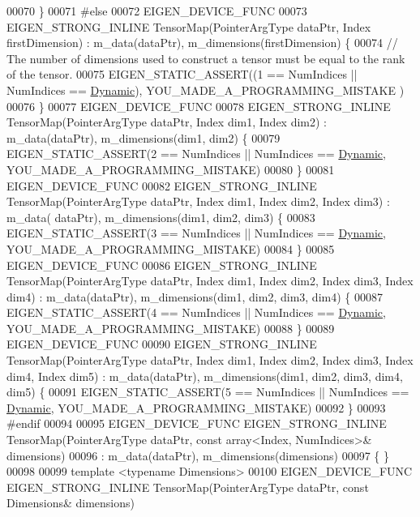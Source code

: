 \begin{DoxyCode}
00070     \}
00071 \textcolor{preprocessor}{#else}
00072     EIGEN\_DEVICE\_FUNC
00073     EIGEN\_STRONG\_INLINE TensorMap(PointerArgType dataPtr, Index firstDimension) : m\_data(dataPtr), 
      m\_dimensions(firstDimension) \{
00074       \textcolor{comment}{// The number of dimensions used to construct a tensor must be equal to the rank of the tensor.}
00075       EIGEN\_STATIC\_ASSERT((1 == NumIndices || NumIndices == \hyperlink{namespace_eigen_ad81fa7195215a0ce30017dfac309f0b2}{Dynamic}), YOU\_MADE\_A\_PROGRAMMING\_MISTAKE
      )
00076     \}
00077     EIGEN\_DEVICE\_FUNC
00078     EIGEN\_STRONG\_INLINE TensorMap(PointerArgType dataPtr, Index dim1, Index dim2) : m\_data(dataPtr), 
      m\_dimensions(dim1, dim2) \{
00079       EIGEN\_STATIC\_ASSERT(2 == NumIndices || NumIndices == \hyperlink{namespace_eigen_ad81fa7195215a0ce30017dfac309f0b2}{Dynamic}, YOU\_MADE\_A\_PROGRAMMING\_MISTAKE)
00080     \}
00081     EIGEN\_DEVICE\_FUNC
00082     EIGEN\_STRONG\_INLINE TensorMap(PointerArgType dataPtr, Index dim1, Index dim2, Index dim3) : m\_data(
      dataPtr), m\_dimensions(dim1, dim2, dim3) \{
00083       EIGEN\_STATIC\_ASSERT(3 == NumIndices || NumIndices == \hyperlink{namespace_eigen_ad81fa7195215a0ce30017dfac309f0b2}{Dynamic}, YOU\_MADE\_A\_PROGRAMMING\_MISTAKE)
00084     \}
00085     EIGEN\_DEVICE\_FUNC
00086     EIGEN\_STRONG\_INLINE TensorMap(PointerArgType dataPtr, Index dim1, Index dim2, Index dim3, Index dim4) :
       m\_data(dataPtr), m\_dimensions(dim1, dim2, dim3, dim4) \{
00087       EIGEN\_STATIC\_ASSERT(4 == NumIndices || NumIndices == \hyperlink{namespace_eigen_ad81fa7195215a0ce30017dfac309f0b2}{Dynamic}, YOU\_MADE\_A\_PROGRAMMING\_MISTAKE)
00088     \}
00089     EIGEN\_DEVICE\_FUNC
00090     EIGEN\_STRONG\_INLINE TensorMap(PointerArgType dataPtr, Index dim1, Index dim2, Index dim3, Index dim4, 
      Index dim5) : m\_data(dataPtr), m\_dimensions(dim1, dim2, dim3, dim4, dim5) \{
00091       EIGEN\_STATIC\_ASSERT(5 == NumIndices || NumIndices == \hyperlink{namespace_eigen_ad81fa7195215a0ce30017dfac309f0b2}{Dynamic}, YOU\_MADE\_A\_PROGRAMMING\_MISTAKE)
00092     \}
00093 \textcolor{preprocessor}{#endif}
00094 
00095    EIGEN\_DEVICE\_FUNC EIGEN\_STRONG\_INLINE TensorMap(PointerArgType dataPtr, \textcolor{keyword}{const} array<Index, NumIndices>& 
      dimensions)
00096       : m\_data(dataPtr), m\_dimensions(dimensions)
00097     \{ \}
00098 
00099     \textcolor{keyword}{template} <\textcolor{keyword}{typename} Dimensions>
00100     EIGEN\_DEVICE\_FUNC EIGEN\_STRONG\_INLINE TensorMap(PointerArgType dataPtr, \textcolor{keyword}{const} Dimensions& dimensions)

\end{DoxyCode}
